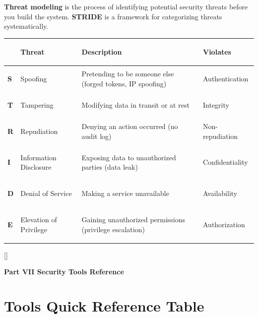\documentclass[11pt, letterpaper]{article}
\newcommand{\purplesections}{%
  \titleformat{\section}{\large\bfseries\color{sectionpurple}}{}{0em}{}[\color{sectionpurple}\titlerule]%
  \titleformat{\subsection}{\normalsize\bfseries\color{sectionpurple!80!black}}{}{0em}{}%
}
\newcommand{\partbanner}[3]{%
  \begin{tcolorbox}[colback=#1, colframe=#2, boxrule=1.2pt, arc=4pt,
    left=8pt, right=8pt, top=6pt, bottom=6pt]
    \begin{center}{\LARGE\bfseries #3}\end{center}
  \end{tcolorbox}%
}
\begin{document}
\textbf{Threat modeling} is the process of identifying potential security threats before you build the system. \textbf{STRIDE} is a framework for categorizing threats systematically.

\noindent
{\renewcommand{\arraystretch}{1.5}
\begin{tabularx}{\textwidth}{>{\bfseries\centering\arraybackslash}p{0.8cm}
                              >{\bfseries\raggedright\arraybackslash}p{3.5cm}
                              >{\raggedright\arraybackslash}X
                              >{\raggedright\arraybackslash}p{2.5cm}}
\toprule
\rowcolor{tableheadergreen}
& \textbf{Threat} & \textbf{Description} & \textbf{Violates} \\
\midrule
\rowcolor{rowA}  \textbf{S} & Spoofing & Pretending to be someone else (forged tokens, IP spoofing) & Authentication \\
\rowcolor{rowBg} \textbf{T} & Tampering & Modifying data in transit or at rest & Integrity \\
\rowcolor{rowA}  \textbf{R} & Repudiation & Denying an action occurred (no audit log) & Non-repudiation \\
\rowcolor{rowBg} \textbf{I} & Information Disclosure & Exposing data to unauthorized parties (data leak) & Confidentiality \\
\rowcolor{rowA}  \textbf{D} & Denial of Service & Making a service unavailable & Availability \\
\rowcolor{rowBg} \textbf{E} & Elevation of Privilege & Gaining unauthorized permissions (privilege escalation) & Authorization \\
\bottomrule
\end{tabularx}}

\newpage

\purplesections
{}
\partbanner{part3bg}{sectionpurple}{Part VII \quad Security Tools Reference}

\vspace{8pt}

\section*{Tools Quick Reference Table}
\end{document}

